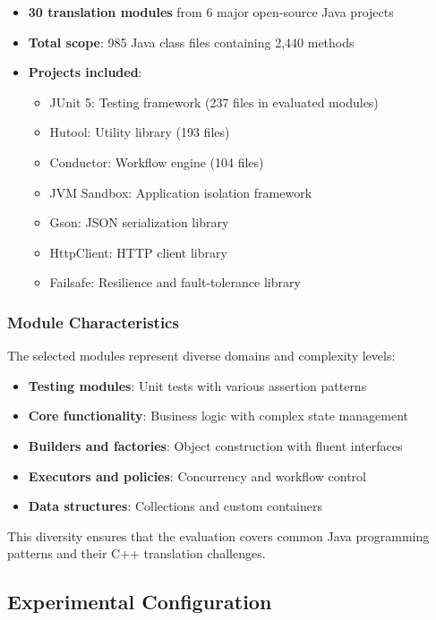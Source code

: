 \begin{itemize}
\item \textbf{30 translation modules} from 6 major open-source Java projects
\item \textbf{Total scope}: 985 Java class files containing 2,440 methods
\item \textbf{Projects included}:
\begin{itemize}
\item JUnit 5: Testing framework (237 files in evaluated modules)
\item Hutool: Utility library (193 files)
\item Conductor: Workflow engine (104 files)
\item JVM Sandbox: Application isolation framework
\item Gson: JSON serialization library
\item HttpClient: HTTP client library
\item Failsafe: Resilience and fault-tolerance library
\end{itemize}
\end{itemize}

\subsubsection{Module Characteristics}

The selected modules represent diverse domains and complexity levels:
\begin{itemize}
\item \textbf{Testing modules}: Unit tests with various assertion patterns
\item \textbf{Core functionality}: Business logic with complex state management
\item \textbf{Builders and factories}: Object construction with fluent interfaces
\item \textbf{Executors and policies}: Concurrency and workflow control
\item \textbf{Data structures}: Collections and custom containers
\end{itemize}

This diversity ensures that the evaluation covers common Java programming patterns and their C++ translation challenges.

\subsection{Experimental Configuration}

